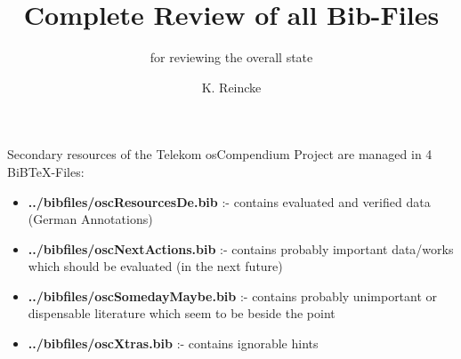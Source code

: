 \documentclass[DIV=calc,BCOR=5mm,11pt,headings=small,oneside,abstract=true,toc=bib]{scrartcl}
\begin{document}
\nocite{*}

\titlehead{Deutsche Konfiguration}
\subject{BiBTeX-Files}
\title{Complete Review of all Bib-Files}
\subtitle{for reviewing the overall state}
\author{K. Reincke}
\maketitle

Secondary resources of the Telekom osCompendium Project are managed in 4
BiBTeX-Files:

\begin{itemize}
  \item {\bfseries ../bibfiles/oscResourcesDe.bib} :- contains evaluated and
  verified data (German Annotations)
  \item {\bfseries ../bibfiles/oscNextActions.bib} :- contains
  probably important data/works which should be evaluated (in the next future)
  \item {\bfseries ../bibfiles/oscSomedayMaybe.bib} :-
  contains probably unimportant or dispensable literature which seem to be beside the point
  \item {\bfseries ../bibfiles/oscXtras.bib} :- contains ignorable hints
\end{itemize}

\small



\footnotesize


\printnomenclature
\end{document}

